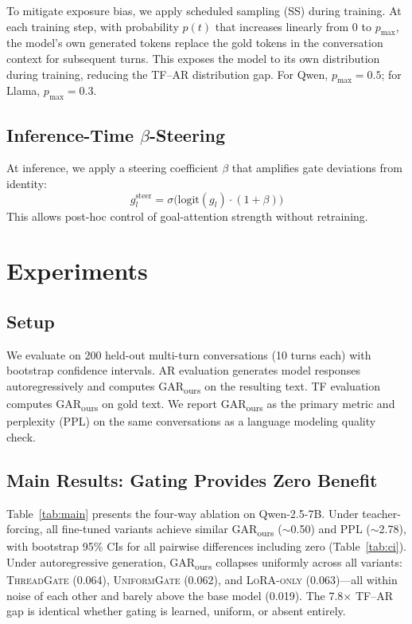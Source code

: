 \documentclass[11pt]{article}
\newcommand{\garours}{\textsc{GAR}\textsubscript{ours}}
\newcommand{\tg}{\textsc{ThreadGate}}
\newcommand{\ug}{\textsc{UniformGate}}
\newcommand{\lo}{\textsc{LoRA-only}}
\begin{document}
To mitigate exposure bias, we apply scheduled sampling (SS) during training. At each training step, with probability $p(t)$ that increases linearly from 0 to $p_{\text{max}}$, the model's own generated tokens replace the gold tokens in the conversation context for subsequent turns. This exposes the model to its own distribution during training, reducing the TF--AR distribution gap. For Qwen, $p_{\text{max}} = 0.5$; for Llama, $p_{\text{max}} = 0.3$.

\subsection{Inference-Time $\beta$-Steering}

At inference, we apply a steering coefficient $\beta$ that amplifies gate deviations from identity:
\begin{equation}
    g_l^{\text{steer}} = \sigma\big(\text{logit}(g_l) \cdot (1 + \beta)\big)
\end{equation}
This allows post-hoc control of goal-attention strength without retraining.

\section{Experiments}

\subsection{Setup}

We evaluate on 200 held-out multi-turn conversations (10 turns each) with bootstrap confidence intervals. AR evaluation generates model responses autoregressively and computes \garours{} on the resulting text. TF evaluation computes \garours{} on gold text. We report \garours{} as the primary metric and perplexity (PPL) on the same conversations as a language modeling quality check.

\subsection{Main Results: Gating Provides Zero Benefit}

Table~\ref{tab:main} presents the four-way ablation on Qwen-2.5-7B. Under teacher-forcing, all fine-tuned variants achieve similar \garours{} (${\sim}$0.50) and PPL (${\sim}$2.78), with bootstrap 95\% CIs for all pairwise differences including zero (Table~\ref{tab:ci}). Under autoregressive generation, \garours{} collapses uniformly across all variants: \tg{} (0.064), \ug{} (0.062), and \lo{} (0.063)---all within noise of each other and barely above the base model (0.019). The 7.8$\times$ TF--AR gap is identical whether gating is learned, uniform, or absent entirely.
\end{document}

